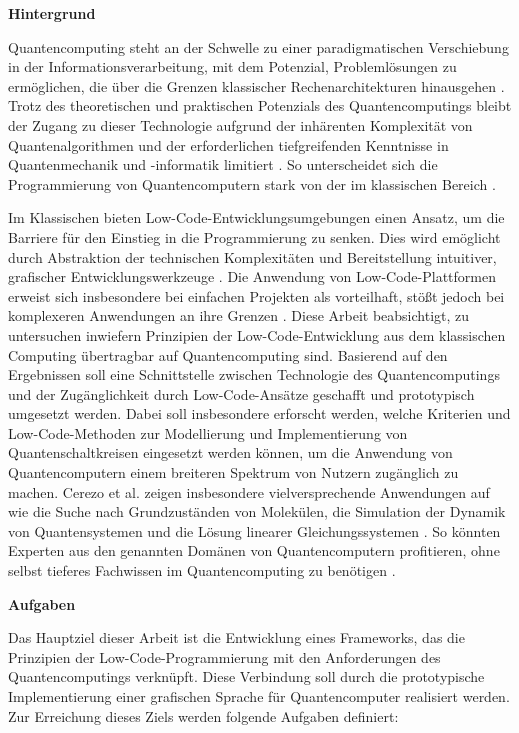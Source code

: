 \textbf{Hintergrund}

Quantencomputing steht an der Schwelle zu einer paradigmatischen
Verschiebung in der Informationsverarbeitung, mit dem Potenzial,
Problemlösungen zu ermöglichen, die über die Grenzen klassischer
Rechenarchitekturen hinausgehen \cite{Shor1999}. Trotz des theoretischen und
praktischen Potenzials des Quantencomputings bleibt der Zugang zu dieser
Technologie aufgrund der inhärenten Komplexität von Quantenalgorithmen
und der erforderlichen tiefgreifenden Kenntnisse in Quantenmechanik und
-informatik limitiert \cite{Chitransh2022}. So unterscheidet sich die Programmierung
von Quantencomputern stark von der im klassischen Bereich \cite{Rieffel2011}.

Im Klassischen bieten Low-Code-Entwicklungsumgebungen einen Ansatz, um
die Barriere für den Einstieg in die Programmierung zu senken. Dies wird
emöglicht durch Abstraktion der technischen Komplexitäten und
Bereitstellung intuitiver, grafischer Entwicklungswerkzeuge \cite{Juhas2022}. Die
Anwendung von Low-Code-Plattformen erweist sich insbesondere bei
einfachen Projekten als vorteilhaft, stößt jedoch bei komplexeren
Anwendungen an ihre Grenzen \cite{Buscher2022}. Diese Arbeit beabsichtigt, zu
untersuchen inwiefern Prinzipien der Low-Code-Entwicklung aus dem
klassischen Computing übertragbar auf Quantencomputing sind. Basierend
auf den Ergebnissen soll eine Schnittstelle zwischen Technologie des
Quantencomputings und der Zugänglichkeit durch Low-Code-Ansätze
geschafft und prototypisch umgesetzt werden. Dabei soll insbesondere
erforscht werden, welche Kriterien und Low-Code-Methoden zur
Modellierung und Implementierung von Quantenschaltkreisen eingesetzt
werden können, um die Anwendung von Quantencomputern einem breiteren
Spektrum von Nutzern zugänglich zu machen. Cerezo et al. zeigen
insbesondere vielversprechende Anwendungen auf wie die Suche nach
Grundzuständen von Molekülen, die Simulation der Dynamik von
Quantensystemen und die Lösung linearer Gleichungssystemen \cite{Cerezo2021}. So
könnten Experten aus den genannten Domänen von Quantencomputern
profitieren, ohne selbst tieferes Fachwissen im Quantencomputing zu
benötigen \cite{Motta2022}.

\textbf{Aufgaben}

Das Hauptziel dieser Arbeit ist die Entwicklung eines Frameworks, das
die Prinzipien der Low-Code-Programmierung mit den Anforderungen des
Quantencomputings verknüpft. Diese Verbindung soll durch die
prototypische Implementierung einer grafischen Sprache für
Quantencomputer realisiert werden. Zur Erreichung dieses Ziels werden
folgende Aufgaben definiert:

